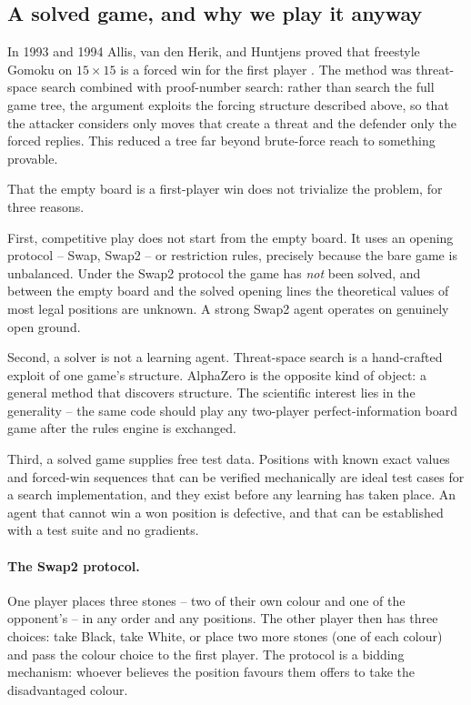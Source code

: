 \subsection{A solved game, and why we play it anyway}
\label{sec:solved}

In 1993 and 1994 Allis, van den Herik, and Huntjens proved that freestyle Gomoku
on $15\times15$ is a forced win for the first player
\citep{allis1996gomoku,allis1994thesis}. The method was threat-space search
combined with proof-number search: rather than search the full game tree, the
argument exploits the forcing structure described above, so that the attacker
considers only moves that create a threat and the defender only the forced
replies. This reduced a tree far beyond brute-force reach to something provable.

That the empty board is a first-player win does not trivialize the problem, for
three reasons.

First, competitive play does not start from the empty board. It uses an opening
protocol -- Swap, Swap2 -- or restriction rules, precisely because the bare game
is unbalanced. Under the Swap2 protocol the game has \emph{not} been solved, and
between the empty board and the solved opening lines the theoretical values of
most legal positions are unknown. A strong Swap2 agent operates on genuinely open
ground.

Second, a solver is not a learning agent. Threat-space search is a hand-crafted
exploit of one game's structure. AlphaZero is the opposite kind of object: a
general method that discovers structure. The scientific interest lies in the
generality -- the same code should play any two-player perfect-information board
game after the rules engine is exchanged.

Third, a solved game supplies free test data. Positions with known exact values
and forced-win sequences that can be verified mechanically are ideal test cases
for a search implementation, and they exist before any learning has taken place.
An agent that cannot win a won position is defective, and that can be established
with a test suite and no gradients.

\paragraph{The Swap2 protocol.} One player places three stones -- two of their
own colour and one of the opponent's -- in any order and any positions. The other
player then has three choices: take Black, take White, or place two more stones
(one of each colour) and pass the colour choice to the first player. The protocol
is a bidding mechanism: whoever believes the position favours them offers to take
the disadvantaged colour.

